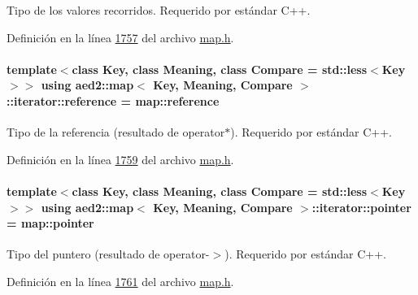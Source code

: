Tipo de los valores recorridos. Requerido por estándar C++. 



Definición en la línea \hyperlink{map_8h_source_l01757}{1757} del archivo \hyperlink{map_8h_source}{map.\+h}.

\paragraph[{\texorpdfstring{reference}{reference}}]{\setlength{\rightskip}{0pt plus 5cm}template$<$class Key, class Meaning, class Compare = std\+::less$<$\+Key$>$$>$ using {\bf aed2\+::map}$<$ Key, Meaning, Compare $>$\+::{\bf iterator\+::reference} =  {\bf map\+::reference}}\hypertarget{classaed2_1_1map_1_1iterator_ac19788914a3110897e44c53f1318f6af_ac19788914a3110897e44c53f1318f6af}{}\label{classaed2_1_1map_1_1iterator_ac19788914a3110897e44c53f1318f6af_ac19788914a3110897e44c53f1318f6af}


Tipo de la referencia (resultado de operator$\ast$). Requerido por estándar C++. 



Definición en la línea \hyperlink{map_8h_source_l01759}{1759} del archivo \hyperlink{map_8h_source}{map.\+h}.

\paragraph[{\texorpdfstring{pointer}{pointer}}]{\setlength{\rightskip}{0pt plus 5cm}template$<$class Key, class Meaning, class Compare = std\+::less$<$\+Key$>$$>$ using {\bf aed2\+::map}$<$ Key, Meaning, Compare $>$\+::{\bf iterator\+::pointer} =  {\bf map\+::pointer}}\hypertarget{classaed2_1_1map_1_1iterator_a52ea7bdbf1dc6b252aec76633564bdf5_a52ea7bdbf1dc6b252aec76633564bdf5}{}\label{classaed2_1_1map_1_1iterator_a52ea7bdbf1dc6b252aec76633564bdf5_a52ea7bdbf1dc6b252aec76633564bdf5}


Tipo del puntero (resultado de operator-\/$>$). Requerido por estándar C++. 



Definición en la línea \hyperlink{map_8h_source_l01761}{1761} del archivo \hyperlink{map_8h_source}{map.\+h}.

